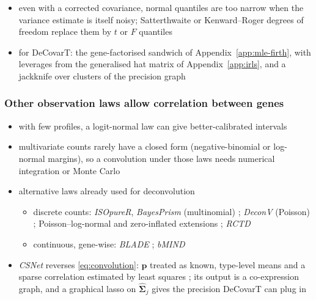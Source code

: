 \documentclass[pdflatex, sn-nature]{sn-jnl}
\theoremstyle{thmstyleone}%
\theoremstyle{thmstyletwo}%
\theoremstyle{thmstylethree}%
\begin{document}
\begin{itemize}
        variance but fills its meat with the model covariance \(\sum_{j}\hat p_{ji}^{2}\hat{\boldsymbol{\Sigma}}_{j}\) rather than with
        empirical outer products, with a finite-sample correction of the plugged-in squared proportions, and its
        authors attribute the under-coverage of \emph{MEAD} to an inconsistent empirical sandwich
        \cite{caiStatisticalInferenceCelltype2024}
  \item even with a corrected covariance, normal quantiles are too narrow when the variance estimate is itself
        noisy; Satterthwaite or Kenward--Roger degrees of freedom replace them by \(t\) or \(F\) quantiles
  \item for DeCovarT: the gene-factorised sandwich of Appendix~\ref{app:mle-firth}, with leverages from the
        generalised hat matrix of Appendix~\ref{app:irls}, and a jackknife over clusters of the precision graph
\end{itemize}

\subsubsection{Other observation laws allow correlation between genes}
\label{sec:outlook}

\begin{itemize}
  \item with few profiles, a logit-normal law can give better-calibrated intervals
        \cite{mcgregorProportionalitybasedAssociationMetrics2026}
  \item multivariate counts rarely have a closed form (negative-binomial or log-normal margins), so a
        convolution under those laws needs numerical integration or Monte Carlo
  \item alternative laws already used for deconvolution
  \begin{itemize}
    \item discrete counts: \emph{ISOpureR}, \emph{BayesPrism} (multinomial)
          \cite{anghelISOpureRImplementationComputational2015,chuCellTypeGeneExpression2022};
          \emph{DeconV} (Poisson) \cite{gynterDeconvProbabilisticCellType2023};
          Poisson--log-normal and zero-inflated extensions
          \cite{chiquetPoissonLognormalModelVersatile2021,batardiereZeroInflationMultivariatePoisson2025};
          \emph{RCTD} \cite{cableRobustDecompositionCell2022a}
    \item continuous, gene-wise: \emph{BLADE} \cite{andrade-barbosaBayesianLogNormalDeconvolution2021};
          \emph{bMIND} \cite{wangBayesianEstimationCelltypespecific2020}
  \end{itemize}
  \item \emph{CSNet} reverses \eqref{eq:convolution}: \(\boldsymbol{p}\) treated as known, type-level means and a
        sparse correlation estimated by least squares \cite{suEstimatingCellTypeSpecificGene2024}; its output is
        a co-expression graph, and a graphical lasso on \(\hat{\boldsymbol{\Sigma}}_{j}\) gives the precision
        DeCovarT can plug in
\end{itemize}
\end{document}
